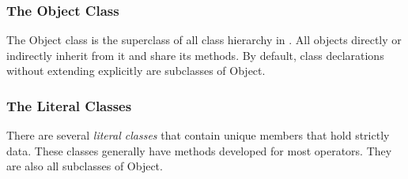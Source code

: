 \subsubsection{The Object Class}
The Object class is the superclass of all class hierarchy in \Lang{}. All objects directly or indirectly inherit from it and share its methods. By default, class declarations without extending explicitly are subclasses of Object.
\subsubsection{The Literal Classes}
There are several \textit{literal classes} that contain unique members that hold strictly data. These classes generally have methods developed for most operators. They are also all subclasses of Object.
